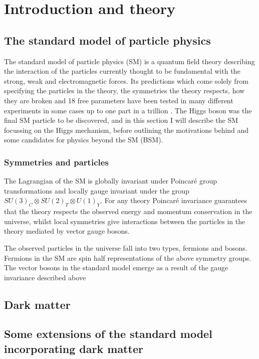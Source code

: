 \chapter{Introduction and theory}
\label{chap:theory}

\section{The standard model of particle physics}
\label{sec:SM}

The standard model of particle physics (SM) is a quantum field theory describing the interaction of the particles currently thought to be fundamental with the strong, weak and electromagnetic forces. Its predictions which come solely from specifying the particles in the theory, the symmetries the theory respects, how they are broken and 18 free parameters have been tested in many different experiments in some cases up to one part in a trillion \cite{PhysRevLett.100.120801}. The Higgs boson was the final SM particle to be discovered, and in this section I will describe the SM focussing on the Higgs mechanism, before outlining the motivations behind and some candidates for physics beyond the SM (BSM).

\subsection{Symmetries and particles}
The Lagrangian of the SM is globally invariant under Poincar\'e group transformations and locally gauge invariant under the group $SU\left(3\right)_{C}\otimes SU\left(2\right)_{T}\otimes U\left(1\right)_{Y}$. For any theory Poincar\'e invariance guarantees that the theory respects the observed energy and momentum conservation in the universe, whilst local symmetries give interactions between the particles in the theory mediated by vector gauge bosons. %

The observed particles in the universe fall into two types, fermions and bosons. Fermions in the SM are spin half representations of the above symmetry groups. The vector bosons in the standard model emerge as a result of the gauge invariance described above %




\section{Dark matter}
\label{sec:DM}

\section{Some extensions of the standard model incorporating dark matter}
\label{sec:DMextensions}
